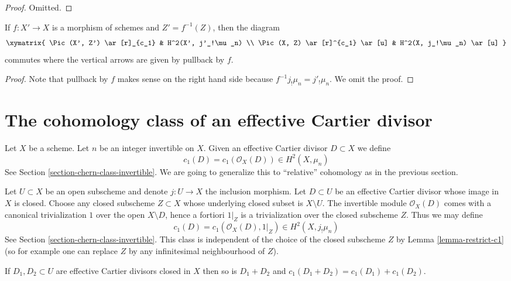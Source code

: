 \begin{proof}
Omitted.
\end{proof}

\begin{lemma}
\label{lemma-pullback-c1}
If $f : X' \to X$ is a morphism of schemes and $Z' = f^{-1}(Z)$,
then the diagram
$$
\xymatrix{
\Pic(X', Z') \ar[r]_{c_1} & H^2(X', j'_!\mu_n) \\
\Pic(X, Z) \ar[r]^{c_1} \ar[u] & H^2(X, j_!\mu_n) \ar[u]
}
$$
commutes where the vertical arrows are given by pullback by $f$.
\end{lemma}

\begin{proof}
Note that pullback by $f$ makes sense on the right hand side
because $f^{-1}j_!\mu_n = j'_!\mu_n$. We omit the proof.
\end{proof}






\section{The cohomology class of an effective Cartier divisor}
\label{section-chern-class-divisor}

\noindent
Let $X$ be a scheme. Let $n$ be an integer invertible on $X$.
Given an effective Cartier divisor $D \subset X$ we define
$$
c_1(D) = c_1(\mathcal{O}_X(D)) \in H^2(X, \mu_n)
$$
See Section \ref{section-chern-class-invertible}. We are going to
generalize this to ``relative'' cohomology as in the previous section.

\medskip\noindent
Let $U \subset X$ be an open subscheme and denote $j : U \to X$
the inclusion morphism. Let $D \subset U$ be an effective Cartier divisor
whose image in $X$ is closed. Choose any closed subscheme $Z \subset X$
whose underlying closed subset is $X \setminus U$.
The invertible module $\mathcal{O}_X(D)$ comes with a
canonical trivialization $1$ over the open $X \setminus D$,
hence a fortiori $1|_Z$ is a trivialization over the closed subscheme $Z$.
Thus we may define
$$
c_1(D) = c_1(\mathcal{O}_X(D), 1|_Z) \in H^2(X, j_!\mu_n)
$$
See Section \ref{section-chern-class-invertible}. This class is independent
of the choice of the closed subscheme $Z$ by Lemma \ref{lemma-restrict-c1}
(so for example one can replace $Z$ by any infinitesimal neighbourhood
of $Z$).

\begin{lemma}
\label{lemma-additive-c1D}
If $D_1, D_2 \subset U$ are effective Cartier divisors closed in $X$
then so is $D_1 + D_2$ and $c_1(D_1 + D_2) = c_1(D_1) + c_1(D_2)$.
\end{lemma}

